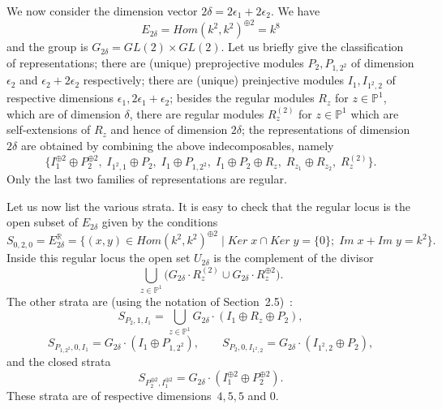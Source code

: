 \documentclass[a4paper,10pt]{amsart}
\numberwithin{equation}{section}
\begin{document}
\vspace{.1in}

We now consider the dimension vector $2\delta=2\epsilon_1+2\epsilon_2$. We have 
$$E_{2\delta}=Hom(k^2, k^2)^{ \oplus 2} =k^8$$
and the group is $G_{2\delta}=GL(2) \times GL(2)$. Let us briefly give the classification of representations; there are (unique) preprojective modules $P_2, P_{1,2^2}$ of dimension $\epsilon_2$ and $\epsilon_2+2\epsilon_2$ respectively; there are (unique) preinjective modules $I_1, I_{1^2,2}$ of respective dimensions $\epsilon_1, 2\epsilon_1+\epsilon_2$; besides the regular modules $R_{z}$ for $z \in \mathbb{P}^1$, which are of dimension $\delta$, there are regular modules $R_z^{(2)}$ for $z \in \mathbb{P}^1$ which are self-extensions of $R_z$ and hence of dimension $2\delta$; the representations of dimension $2\delta$ are obtained by combining the above indecomposables, namely
\begin{equation}\label{E:classind}
\big\{ I_1^{\oplus 2} \oplus P_2^{\oplus 2},\; I_{1^2,1} \oplus P_2, \;I_{1} \oplus P_{1,2^2}, \;I_1 \oplus P_2 \oplus R_z, \;R_{z_1} \oplus R_{z_2}, \;R_z^{(2)}\big\}.
\end{equation}
Only the last two families of representations are regular. 

\vspace{.1in}

Let us now list the various strata. It is easy to check that the regular locus is the open subset of $E_{2\delta}$ given by the conditions
$$S_{0,2,0}=E_{2\delta}^{\mathbb{R}}=\big\{ (x,y) \in Hom(k^2,k^2)^{\oplus 2}\;|\; Ker\;x \cap Ker\;y=\{0\};\; Im\;x + Im\;y =k^2\big\}.$$
Inside this regular locus the open set $U_{2\delta}$ is the complement of the divisor
$$\bigcup_{z \in \mathbb{P}^1}  \big( G_{2\delta} \cdot R_z^{(2)} \cup G_{2\delta}\cdot R_z^{\oplus 2} \big).$$
The other strata are (using the notation of Section~2.5)~:
$$S_{P_2, 1, I_{ 1}}=\bigcup_{z \in \mathbb{P}^1} G_{2\delta} \cdot (I_1 \oplus R_z \oplus P_2),$$
$$S_{P_{1,2^2}, 0, I_{1}}=G_{2\delta} \cdot (I_{1} \oplus P_{1,2^2}), \qquad S_{P_{2}, 0, I_{1^2,2}}=G_{2\delta} \cdot (I_{1^2,2} \oplus P_{2}),$$ 
and the closed strata
$$S_{P_2^{\oplus 2}, I_1^{\oplus 2}}=G_{2\delta} \cdot (I_1^{\oplus 2} \oplus P_2^{\oplus 2}).$$
These strata are of respective dimensions~$4,5,5$ and $0$.
 
\vspace{.1in}
 
\end{document}
